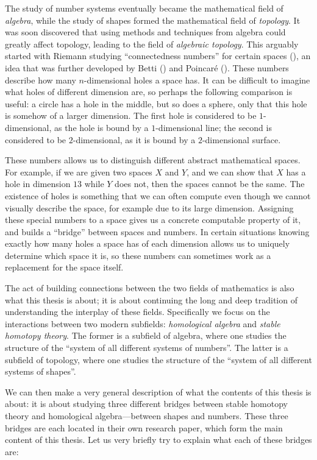 The study of number systems eventually became the mathematical field of \emph{algebra}, while the study of shapes formed the mathematical field of \emph{topology}. It was soon discovered that using methods and techniques from algebra could greatly affect topology, leading to the field of \emph{algebraic topology}. This arguably started with Riemann studying ``connectedness numbers'' for certain spaces (\cite{riemann_1857}), an idea that was further developed by Betti (\cite{betti_1870}) and Poincaré (\cite{poincare_1895}). These numbers describe how many $n$-dimensional holes a space has. It can be difficult to imagine what holes of different dimension are, so perhaps the following comparison is useful: a circle has a hole in the middle, but so does a sphere, only that this hole is somehow of a larger dimension. The first hole is considered to be $1$-dimensional, as the hole is bound by a $1$-dimensional line; the second is considered to be $2$-dimensional, as it is bound by a $2$-dimensional surface. 

These numbers allows us to distinguish different abstract mathematical spaces. For example, if we are given two spaces $X$ and $Y$, and we can show that $X$ has a hole in dimension $13$ while $Y$ does not, then the spaces cannot be the same. The existence of holes is something that we can often compute even though we cannot visually describe the space, for example due to its large dimension. Assigning these special numbers to a space gives us a concrete computable property of it, and builds a ``bridge'' between spaces and numbers. In certain situations knowing exactly how many holes a space has of each dimension allows us to uniquely determine which space it is, so these numbers can sometimes work as a replacement for the space itself. 

The act of building connections between the two fields of mathematics is also what this thesis is about; it is about continuing the long and deep tradition of understanding the interplay of these fields. Specifically we focus on the interactions between two modern subfields: \emph{homological algebra} and \emph{stable homotopy theory}. The former is a subfield of algebra, where one studies the structure of the ``system of all different systems of numbers''. The latter is a subfield of topology, where one studies the structure of the ``system of all different systems of shapes''. 

We can then make a very general description of what the contents of this thesis is about: it is about studying three different bridges between stable homotopy theory and homological algebra---between shapes and numbers. These three bridges are each located in their own research paper, which form the main content of this thesis. Let us very briefly try to explain what each of these bridges are: 

